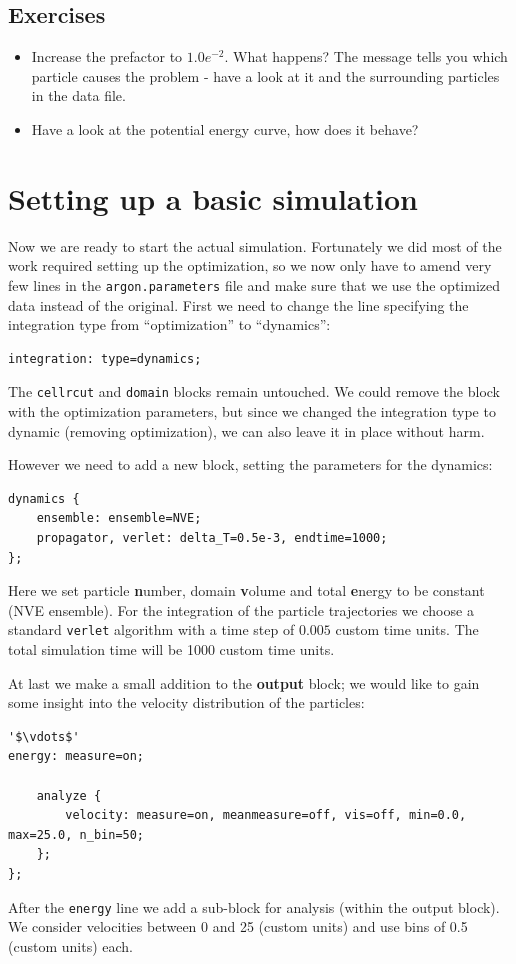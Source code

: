 \subsection{Exercises}
\begin{itemize}
\item Increase the prefactor to $1.0e^{-2}$. What happens? The message tells you which particle causes the problem - have a look at it and the surrounding particles in the data file.
\item Have a look at the potential energy curve, how does it behave?
\end{itemize}

\section{Setting up a basic simulation}
Now we are ready to start the actual simulation. Fortunately we did most
of the work required setting up the optimization, so we now only have to
amend very few lines in the \texttt{argon.parameters} file and make sure
that we use the optimized data instead of the original.
First we need to change the line specifying the integration type from ``optimization'' to ``dynamics'':
\begin{lstlisting}
integration: type=dynamics;
\end{lstlisting}
 The \texttt{cellrcut} and \texttt{domain} blocks remain untouched.
 We could remove the block with the optimization parameters, but since
 we changed the integration type to dynamic (removing optimization), we can also leave it in place without harm.

However we need to add a new block, setting the parameters for the dynamics:
\begin{lstlisting}
dynamics {
    ensemble: ensemble=NVE;
    propagator, verlet: delta_T=0.5e-3, endtime=1000;
};
\end{lstlisting}
Here we set particle \textbf{n}umber, domain \textbf{v}olume and total
\textbf{e}nergy to be constant (NVE ensemble). For the integration of the
particle trajectories we choose a standard \texttt{verlet} algorithm with a
time step of $0.005$ custom time units. The total simulation time will be 1000 custom time units. 

At last we make a small addition to the \textbf{output} block; we would like to gain some insight into the velocity distribution of the particles:

\begin{lstlisting}[escapechar=']
 '$\vdots$'
energy: measure=on;

    analyze {
        velocity: measure=on, meanmeasure=off, vis=off, min=0.0, max=25.0, n_bin=50;
    };
};
\end{lstlisting}
After the \texttt{energy} line we add a sub-block for analysis (within the output block).
We consider velocities between 0 and 25 (custom units) and use bins of 0.5 (custom units) each.

